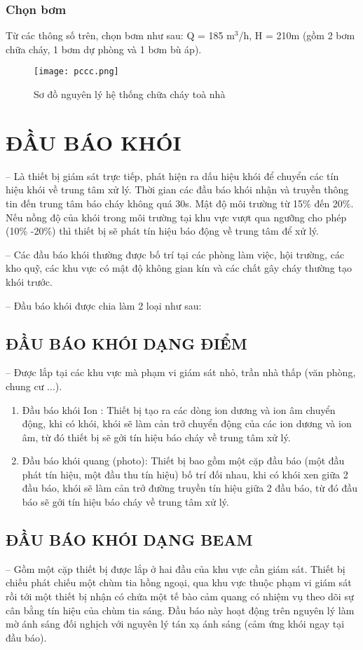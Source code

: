 \subsubsection{Chọn bơm}
Từ các thông số trên, chọn bơm như sau: Q = 185 m$^3$/h, H = 210m (gồm 2 bơm chữa cháy, 1 bơm dự phòng và 1 bơm bù áp).
\begin{figure}[H]
	\centering
	\caption{Sơ đồ nguyên lý hệ thống chữa cháy toà nhà}
	\texttt{[image: pccc.png]}
\end{figure}

\section{ĐẦU BÁO KHÓI}
-- Là thiết bị giám sát trực tiếp, phát hiện ra dấu hiệu khói để chuyển các tín hiệu khói về trung tâm xử lý. Thời gian các đầu báo khói nhận và truyền thông tin đến trung tâm báo cháy không quá 30s. Mật độ môi trường từ 15\% đến 20\%. Nếu nồng độ của khói trong môi trường tại khu vực vượt qua ngưỡng cho phép (10\% -20\%) thì thiết bị sẽ phát tín hiệu báo động về trung tâm để xử lý.

-- Các đầu báo khói thường được bố trí tại các phòng làm việc, hội trường, các kho quỹ, các khu vực có mật độ không gian kín và các chất gây cháy thường tạo khói trước.

\break
-- Đầu báo khói được chia làm 2 loại như sau:
\subsection{ĐẦU BÁO KHÓI DẠNG ĐIỂM}
-- Được lắp tại các khu vực mà phạm vi giám sát nhỏ, trần nhà thấp (văn phòng, chung cư ...).
\begin{enumerate}
	\item Đầu báo khói Ion : Thiết bị tạo ra các dòng ion dương và ion âm chuyển động, khi có khói, khói sẽ làm cản trở chuyển động của các ion dương và ion âm, từ đó thiết
	bị sẽ gởi tín hiệu báo cháy về trung tâm xử lý.
	\item Đầu báo khói quang (photo): Thiết bị bao gồm một cặp đầu báo (một đầu phát tín hiệu, một đầu thu tín hiệu) bố trí đối nhau, khi có khói xen giữa 2 đầu báo, khói sẽ làm cản trở đường truyền tín hiệu giữa 2 đầu báo, từ đó đầu báo sẽ gởi tín hiệu báo cháy về trung tâm xử lý.
\end{enumerate}

\subsection{ĐẦU BÁO KHÓI DẠNG BEAM}
-- Gồm một cặp thiết bị được lắp ở hai đầu của khu vực cần giám sát. Thiết bị chiếu phát chiếu một chùm tia hồng ngoại, qua khu vực thuộc phạm vi giám sát rồi tới một thiết bị nhận có chứa một tế bào cảm quang có nhiệm vụ theo dõi sự cân bằng tín hiệu của chùm tia sáng. Đầu báo này hoạt động trên nguyên lý làm mờ ánh sáng đối nghịch với nguyên lý tán xạ ánh sáng (cảm ứng khói ngay tại đầu báo).

